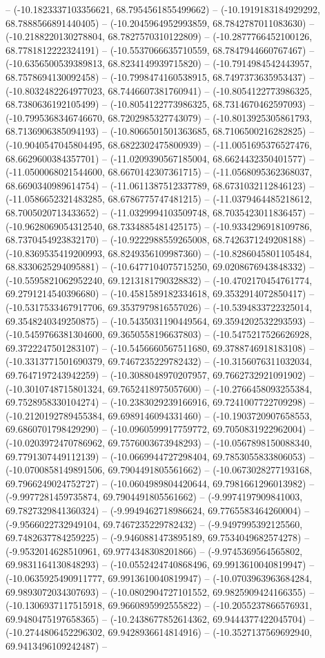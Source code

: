 -- (-10.1823337103356621, 68.7954561855499662) -- (-10.1919183184929292, 68.7888566891440405) -- (-10.2045964952993859, 68.7842787011083630) -- (-10.2188220130278804, 68.7827570310122809) -- (-10.2877766452100126, 68.7781812222324191) -- (-10.5537066635710559, 68.7847944660767467) -- (-10.6356500539389813, 68.8234149939715820) -- (-10.7914984542443957, 68.7578694130092458) -- (-10.7998474160538915, 68.7497373635953437) -- (-10.8032482264977023, 68.7446607381760941) -- (-10.8054122773986325, 68.7380636192105499) -- (-10.8054122773986325, 68.7314670462597093) -- (-10.7995368346746670, 68.7202985327743079) -- (-10.8013925305861793, 68.7136906385094193) -- (-10.8066501501363685, 68.7106500216282825) -- (-10.9040547045804495, 68.6822302475800939) -- (-11.0051695376527476, 68.6629600384357701) -- (-11.0209390567185004, 68.6624432350401577) -- (-11.0500068021544600, 68.6670142307361715) -- (-11.0568095362368037, 68.6690340989614754) -- (-11.0611387512337789, 68.6731032112846123) -- (-11.0586652321483285, 68.6786775747481215) -- (-11.0379464485218612, 68.7005020713433652) -- (-11.0329994103509748, 68.7035423011836457) -- (-10.9628069054312540, 68.7334885481425175) -- (-10.9334296918109786, 68.7370454923832170) -- (-10.9222988559265008, 68.7426371249208188) -- (-10.8369535419200993, 68.8249356109987360) -- (-10.8286045801105484, 68.8330625294095881) -- (-10.6477104075715250, 69.0208676943848332) -- (-10.5595821062952240, 69.1213181790328832) -- (-10.4702170454761774, 69.2791214540396680) -- (-10.4581589182334618, 69.3532914072850417) -- (-10.5317533467917706, 69.3537979816557026) -- (-10.5394833722325014, 69.3548240349250875) -- (-10.5435031190449564, 69.3594202532293593) -- (-10.5459766381304600, 69.3650558196637803) -- (-10.5475217526626928, 69.3722247501283107) -- (-10.5456660567511680, 69.3788746918183108) -- (-10.3313771501690379, 69.7467235229782432) -- (-10.3156076311032034, 69.7647197243942259) -- (-10.3088048970207957, 69.7662732921091902) -- (-10.3010748715801324, 69.7652418975057600) -- (-10.2766458093255384, 69.7528958330104274) -- (-10.2383029239166916, 69.7241007722709298) -- (-10.2120192789455384, 69.6989146094331460) -- (-10.1903720907658553, 69.6860701798429290) -- (-10.0960599917759772, 69.7050831922962004) -- (-10.0203972470786962, 69.7576003673948293) -- (-10.0567898150088340, 69.7791307449112139) -- (-10.0669944727298404, 69.7853055833806053) -- (-10.0700858149891506, 69.7904491805561662) -- (-10.0673028277193168, 69.7966249024752727) -- (-10.0604989804420644, 69.7981661296013982) -- (-9.9977281459735874, 69.7904491805561662) -- (-9.9974197909841003, 69.7827329841360324) -- (-9.9949462718986624, 69.7765583464260004) -- (-9.9566022732949104, 69.7467235229782432) -- (-9.9497995392125560, 69.7482637784259225) -- (-9.9460881473895189, 69.7534049682574278) -- (-9.9532014628510961, 69.9774348308201866) -- (-9.9745369564565802, 69.9831164130848293) -- (-10.0552424740868496, 69.9913610040819947) -- (-10.0635925490911777, 69.9913610040819947) -- (-10.0703963963684284, 69.9893072034307693) -- (-10.0802904727101552, 69.9825909424166355) -- (-10.1306937117515918, 69.9660895992555822) -- (-10.2055237866576931, 69.9480475197658365) -- (-10.2438677852614362, 69.9444377422045704) -- (-10.2744806452296302, 69.9428936614814916) -- (-10.3527137569692940, 69.9413496109242487) -- 